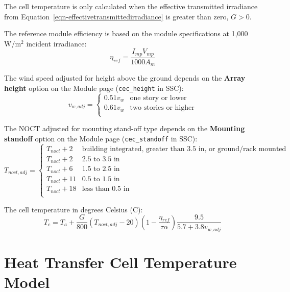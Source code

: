 \documentclass[12pt,letterpaper]{article}
\begin{document}
The cell temperature is only calculated when the effective transmitted irradiance from Equation~\ref{eqn-effectivetransmittedirradiance} is greater than zero, $G>0$.

The reference module efficiency is based on the module specifications at 1,000 W/m$^2$ incident irradiance:
\begin{equation}
\eta_{ref} = \frac{I_{mp} V_{mp}}{1000 A_m}
\end{equation}

The wind speed adjusted for height above the ground depends on the \textbf{Array height} option on the Module page (\texttt{cec\_height} in SSC):
\begin{equation}
v_{w,adj} = \left\{
\begin{array}{ll}
0.51 v_{w} & \text{one story or lower} \\
0.61 v_{w} & \text{two stories or higher} \\
\end{array}
\right.
\end{equation}

The NOCT adjusted for mounting stand-off type depends on the \textbf{Mounting standoff} option on the Module page (\texttt{cec\_standoff} in SSC):
\begin{equation}
T_{noct,adj} =\left\{
\begin{array}{ll}
T_{noct} + 2  & \text{building integrated, greater than 3.5 in, or ground/rack mounted}\\
T_{noct} + 2 & \text{2.5 to 3.5 in} \\
T_{noct} + 6 & \text{1.5 to 2.5 in} \\
T_{noct} + 11 & \text{0.5 to 1.5 in} \\
T_{noct} + 18 & \text{less than 0.5 in} \\
\end{array}
\right.
\end{equation}

The cell temperature in degrees Celsius (\degree C):
\begin{equation}
T_c = T_a + \frac{G}{800} \left(T_{noct,adj} - 20 \right) \left(1-\frac{\eta_{ref}}{\tau \alpha}\right) \frac{9.5}{5.7+3.8v_{w,adj}}
\end{equation}

\section{Heat Transfer Cell Temperature Model}\label{sec-tcheattransfer}
\end{document}

